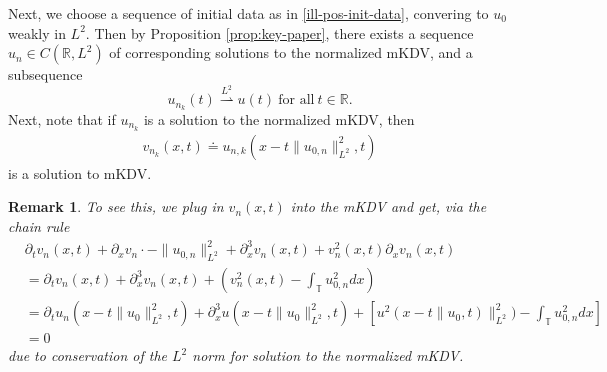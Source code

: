 \documentclass[12pt,reqno]{amsart}
\numberwithin{equation}{section}  %
\newcommand{\rr}{\mathbb{R}}
\newcommand{\ci}{\mathbb{T}}
\newcommand{\p}{\partial}
\newtheorem{remark}[theorem]{Remark}
\begin{document}
%
%
%
%
%
%
%
%
%
%
Next, we choose a sequence of initial data as in \eqref{ill-pos-init-data},
convering to $u_{0}$ weakly in $L^{2}$.  
Then by Proposition \ref{prop:key-paper}, there exists a sequence
$u_{n} \in C(\rr, L^{2})$ of corresponding solutions to the normalized mKDV, and
a subsequence 
\begin{equation*}
  u_{n_{k}}(t) \overset{L^{2}}{\rightharpoonup} u(t) \ \text{for
all} \ t \in \rr.
\end{equation*}
Next, note that if $u_{n_{k}}$ is a solution to the
normalized mKDV, then  
%
\begin{equation}
  \label{mkdv-sol}
\begin{split}
  v_{n_{k}}(x,t) \doteq u_{n,k}\left( x - t \| u_{0,n} \|^{2}_{L^{2}}, t \right)
\end{split}
\end{equation}
%
%
is a solution to mKDV.  
\begin{framed}
  \begin{remark}
    To see this, we plug in
$v_{n}(x,t)$ into the mKDV and get, via the chain rule
%
%
\begin{equation*}
\begin{split}
  & \p_{t} v_{n}(x,t) + \p_{x} v_{n} \cdot -\| u_{0,n} \|_{L^{2}}^{2} +
  \p_{x}^{3} v_{n}(x,t) + v_{n}^{2}(x,t) \p_{x} v_{n}(x,t)
  \\
  & = \p_{t} v_{n}(x,t) + \p_{x}^{3} v_{n}(x,t) + \left( v_{n}^{2}(x,t) -
  \int_{\ci} u_{0,n}^{2} dx \right)
  \\
  & = \p_{t} u_{n}(x - t \| u_{0} \|^{2}_{L^{2}},t) + \p_{x}^{3} u(x - t \|
  u_{0} \|^{2}_{L^{2}},t) + \left[ u^{2}(x - t \| u_{0},t) \|^{2}_{L^{2}}) -
  \int_{\ci} u^{2}_{0,n} dx \right]
  \\
  & = 0
\end{split}
\end{equation*}
%
%
due to conservation of the $L^{2}$ norm for solution to the normalized mKDV.
\end{remark}
\end{framed}
\end{document}
